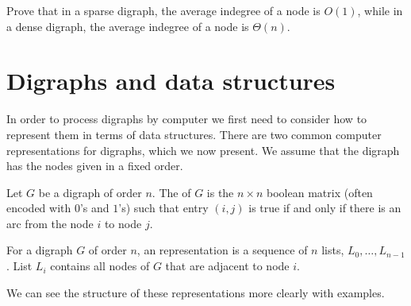 \begin{Exercise}
\label{ex:sparse-deg}
Prove that in a sparse digraph, the average indegree of a node is $O(1)$, 
while in a dense digraph, the  average indegree of a node is $\Theta(n)$.
\end{Exercise}

\section{Digraphs and data structures}\label{sec:graph-reps}

In order to process digraphs by computer we first need to consider how
to represent them in terms of data structures. There are two common
computer representations for digraphs, which we now present. We assume
that the digraph has the nodes given in a fixed order. 

\begin{Definition}

Let $G$ be a digraph of order $n$. The  of $G$
is the $n\times n$ boolean matrix (often encoded with $0$'s and $1$'s)
such that entry $(i,j)$ is true if and only if there is an arc from the
node $i$ to node $j$.

\end{Definition}

\begin{Definition}
For a digraph $G$ of order $n$, an 
representation is a sequence of $n$ lists, $L_0, \dots, L_{n-1}$. List $L_i$  
contains all nodes of $G$ that are adjacent to node $i$.
\end{Definition}

We can see the structure of these representations more clearly with
examples.

